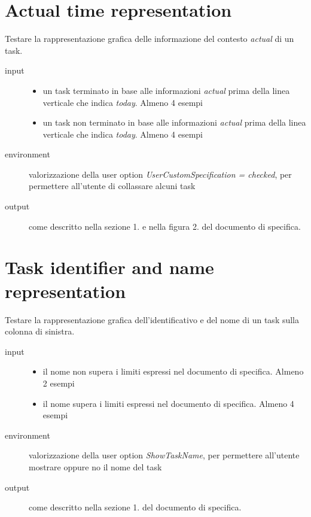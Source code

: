 \section{Actual time representation}
\label{sec:actualTimeTaskRepresentation}
Testare la rappresentazione grafica delle informazione del contesto
\emph{actual} di un task.
\begin{description}
\item[input]  \quad
\begin{itemize}
  \item un task terminato in base alle informazioni \emph{actual} prima della
  linea verticale che indica \emph{today}. Almeno 4 esempi
  \item un task non terminato in base alle informazioni \emph{actual} prima della
  linea verticale che indica \emph{today}. Almeno 4 esempi
\end{itemize}
\item[environment] valorizzazione della user option
\emph{UserCustomSpecification = checked}, per permettere all'utente di
collassare alcuni task
\item[output] come descritto nella sezione 1. e nella figura 2. del
documento di specifica.
\end{description}

\section{Task identifier and name representation}
\label{sec:identifierNameTaskRepresentation}
Testare la rappresentazione grafica dell'identificativo e del nome di un task
sulla colonna di sinistra.
\begin{description}
\item[input]  \quad
\begin{itemize}
  \item il nome non supera i limiti espressi nel documento di specifica. Almeno
  2 esempi
  \item il nome supera i limiti espressi nel documento di specifica. Almeno 4 
  esempi
\end{itemize}
\item[environment] valorizzazione della user option
\emph{ShowTaskName}, per permettere all'utente mostrare oppure no il nome del
task
\item[output] come descritto nella sezione 1. del
documento di specifica.
\end{description}

